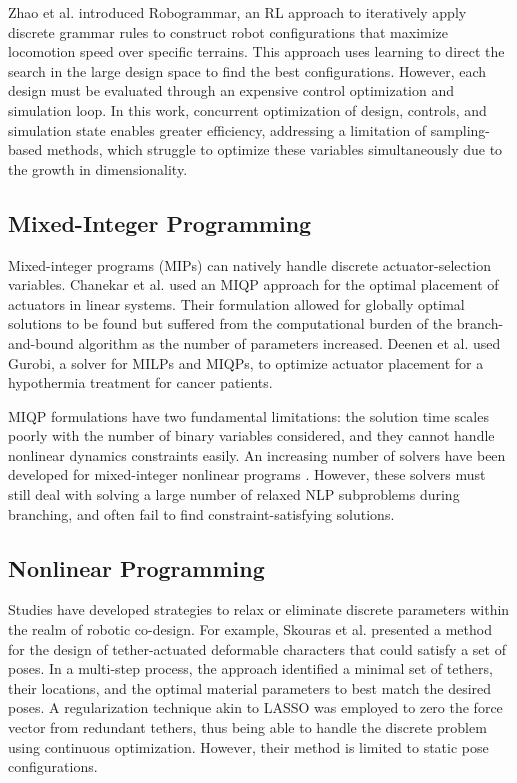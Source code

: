 \documentclass[runningheads]{llncs}
\newcommand{\todo}[1]{\textcolor{red}{TODO: #1}}
\begin{document}

Zhao et al. \cite{Zhao2020} introduced Robogrammar, an RL approach to iteratively apply discrete grammar rules to construct robot configurations that maximize locomotion speed over specific terrains. This approach uses learning to direct the search in the large design space to find the best configurations. However, each design must be evaluated through an expensive control optimization and simulation loop. In this work, concurrent optimization of design, controls, and simulation state enables greater efficiency, addressing a limitation of sampling-based methods, which struggle to optimize these variables simultaneously due to the growth in dimensionality.
\subsection{Mixed-Integer Programming}
Mixed-integer programs (MIPs) can natively handle discrete actuator-selection variables. Chanekar et al. \cite{Chanekar2017} used an MIQP approach for the optimal placement of actuators in linear systems. Their formulation allowed for globally optimal solutions to be found but suffered from the computational burden of the branch-and-bound algorithm as the number of parameters increased. Deenen et al. \cite{Deenen2023} used Gurobi, a solver for MILPs and MIQPs, to optimize actuator placement for a hypothermia treatment for cancer patients.

MIQP formulations have two fundamental limitations: the solution time scales poorly with the number of binary variables considered, and they cannot handle nonlinear dynamics constraints easily. An increasing number of solvers have been developed for mixed-integer nonlinear programs \cite{kronqvist2019review, juniper, alpine_JOGO2019}. However, these solvers must still deal with solving a large number of relaxed NLP subproblems during branching, and often fail to find constraint-satisfying solutions. 

\vspace{-7pt}
\subsection{Nonlinear Programming}
Studies have developed strategies to relax or eliminate discrete parameters within the realm of robotic co-design. For example, Skouras et al. \cite{Skouras2013} presented a method for the design of tether-actuated deformable characters that could satisfy a set of poses. In a multi-step process, the approach identified a minimal set of tethers, their locations, and the optimal material parameters to best match the desired poses. A regularization technique akin to LASSO was employed to zero the force vector from redundant tethers, thus being able to handle the discrete problem using continuous optimization. However, their method is limited to static pose configurations. 
\end{document}
